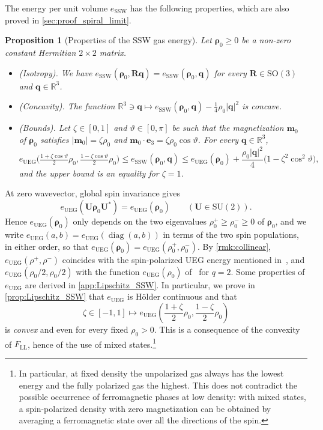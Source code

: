 \documentclass[final,reqno]{amsart}
\newtheorem{proposition}[theorem]{Proposition}
\theoremstyle{remark}
\renewcommand{\le}{\leqslant}
\renewcommand{\ge}{\geqslant}
\DeclareMathOperator{\diag}{diag}
\newcommand{\RR}{\mathbb{R}}
\newcommand{\SO}{\mathrm{SO}}
\newcommand{\SU}{\mathrm{SU}}
\newcommand{\LL}{\mathrm{LL}}
\newcommand{\UEG}{\mathrm{UEG}}
\newcommand{\SSW}{\mathrm{SSW}}
\begin{document}
The energy per unit volume $e_\SSW$ has the following properties, which are also proved in \cref{sec:proof_spiral_limit}.

\begin{proposition}[Properties of the SSW gas energy]\label{prop:SSW_properties}
Let $\bm{\rho}_0\ge0$ be a non-zero constant Hermitian $2\times 2$ matrix.
\begin{itemize}
\item[(i)] \emph{(Isotropy)}. We have $e_\SSW(\bm{\rho}_0,\mathbf{R}\mathbf{q})=e_\SSW(\bm{\rho}_0,\mathbf{q})$ for every $\mathbf{R}\in\SO(3)$ and $\mathbf{q}\in\RR^3$.
\item[(ii)] \emph{(Concavity)}. The function $\RR^3\ni\mathbf{q}\mapsto e_\SSW(\bm{\rho}_0,\mathbf{q})-\frac14\rho_0|\mathbf{q}|^2$ is concave.
\item[(iii)] \emph{(Bounds)}. Let $\zeta\in[0,1]$ and $\vartheta\in[0,\pi]$ be such that the magnetization $\mathbf{m}_0$ of $\bm{\rho}_0$ satisfies $|\mathbf{m}_0|=\zeta\rho_0$ and $\mathbf{m}_0\cdot\mathbf{e}_3=\zeta\rho_0\cos\vartheta$. For every $\mathbf{q}\in\RR^3$,
\begin{equation}\label{eq:spiral_UEG}
e_\UEG\big(\tfrac{1+\zeta\cos\vartheta}2\rho_0,\tfrac{1-\zeta\cos\vartheta}2\rho_0\big)\le e_\SSW(\bm{\rho}_0,\mathbf{q})\le e_\UEG(\bm{\rho}_0)+\frac{\rho_0|\mathbf{q}|^2}{4}\big(1-\zeta^2\cos^2\vartheta\big),
\end{equation}
and the upper bound is an equality for $\zeta=1$.
\end{itemize}
\end{proposition}

At zero wavevector, global spin invariance gives
\begin{equation*}
e_\UEG(\mathbf{U}\bm{\rho}_0\mathbf{U}^*)=e_\UEG(\bm{\rho}_0)\qquad(\mathbf{U}\in\SU(2)).
\end{equation*}
Hence $e_\UEG(\bm{\rho}_0)$ only depends on the two eigenvalues $\rho_0^+\ge\rho_0^-\ge0$ of $\bm{\rho}_0$, and we write $e_\UEG(a,b)=e_\UEG(\diag(a,b))$ in terms of the two spin populations, in either order, so that $e_\UEG(\bm{\rho}_0)=e_\UEG(\rho_0^+,\rho_0^-)$. By \cref{rmk:collinear}, $e_\UEG(\rho^+,\rho^-)$ coincides with the spin-polarized UEG energy mentioned in~\cite[Remark~6]{lewin2020local}, and $e_\UEG(\rho_0/2,\rho_0/2)$ with the function $e_\UEG(\rho_0)$ of~\cite[Theorem 1]{lewin2020local} for $q=2$. Some properties of $e_\UEG$ are derived in \cref{app:Lipschitz_SSW}. In particular, we prove in \cref{prop:Lipschitz_SSW} that $e_\UEG$ is H\"older continuous and that
$$
\zeta\in[-1,1]\mapsto e_\UEG\left(\frac{1+\zeta}{2}\rho_0,\frac{1-\zeta}{2}\rho_0\right)
$$
is \emph{convex} and even for every fixed $\rho_0>0$. This is a consequence of the convexity of $F_\LL$, hence of the use of mixed states.\footnote{In particular, at fixed density the unpolarized gas always has the lowest energy and the fully polarized gas the highest. This does not contradict the possible occurrence of ferromagnetic phases at low density: with mixed states, a spin-polarized density with zero magnetization can be obtained by averaging a ferromagnetic state over all the directions of the spin. }
\end{document}
